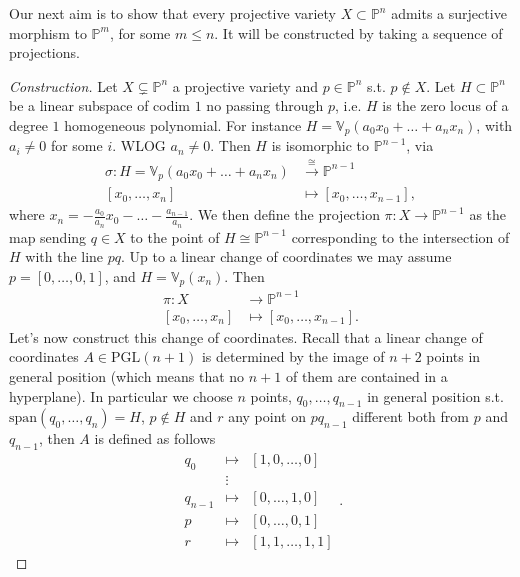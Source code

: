 \begin{rem}
	Our next aim is to show that every projective variety $X \subset \mathbb{P}^{n}$ admits a surjective morphism to $\mathbb{P}^{m}$, for some $m \leq n$.
	It will be constructed by taking a sequence of projections.
\end{rem}
\begin{proof}[Construction]
	Let $X \subsetneq \mathbb{P}^{n}$ a projective variety and $p \in \mathbb{P}^{n}$ s.t. $p \not\in X$.
	Let $H \subset \mathbb{P}^{n}$ be a linear subspace of codim $1$ no passing through $p$,
	i.e. $H$ is the zero locus of a degree $1$ homogeneous polynomial.
	For instance $H = \mathbb{V}_p\left( a_0 x_0 + \ldots + a_n x_n \right)$, with $a_i \neq 0$ for some $i$.
	WLOG $a_n \neq 0$.
	Then $H$ is isomorphic to $\mathbb{P}^{n-1}$, via
	\begin{align}
		\sigma: H = \mathbb{V}_p\left( a_0 x_0 + \ldots + a_n x_n \right) &\xrightarrow{\cong} \mathbb{P}^{n-1} \\
		\left[ x_0 , \ldots , x_n \right] &\mapsto \left[ x_0 , \ldots , x_{n-1} \right]
	,\end{align} 
	where $x_n = -\frac{a_0}{a_n} x_0 - \ldots - \frac{a_{n-1}}{a_n}$.
	We then define the projection $\pi: X \to \mathbb{P}^{n-1}$ as the map sending $q \in X$
	to the point of $H \cong \mathbb{P}^{n-1}$ corresponding to the intersection of $H$ with the line $pq$.
	Up to a linear change of coordinates we may assume $p = \left[ 0 , \ldots , 0, 1 \right]$,
	and $H = \mathbb{V}_p\left( x_n \right)$.
	Then
	\begin{align}
		\pi: X &\to \mathbb{P}^{n-1} \\
		\left[ x_0 , \ldots , x_n \right] &\mapsto \left[ x_0 , \ldots , x_{n-1} \right]
	.\end{align} 
	Let's now construct this change of coordinates.
	Recall that a linear change of coordinates $A \in \mathrm{PGL}(n+1)$ is determined by the image
	of $n+2$ points in general position (which means that no $n+1$ of them are contained in a hyperplane).
	In particular we choose $n$ points, $q_0, \ldots, q_{n-1}$ in general position s.t. $\mathrm{span}(q_0, \ldots, q_n) = H$,
	$p \not\in H$ and $r$ any point on $pq_{n-1}$ different both from $p$ and $q_{n-1}$, then $A$ is defined as follows
	\begin{equation}
	\begin{matrix}
		q_0& \mapsto &\left[ 1, 0 , \ldots , 0 \right]\\
		   &\vdots&\\
		q_{n-1}& \mapsto &\left[ 0 , \ldots , 1, 0 \right]\\
		p& \mapsto &\left[ 0 , \ldots , 0, 1 \right]\\
		r& \mapsto &\left[ 1, 1 , \ldots , 1, 1 \right]
	\end{matrix} 
	.\end{equation} 
\end{proof}

